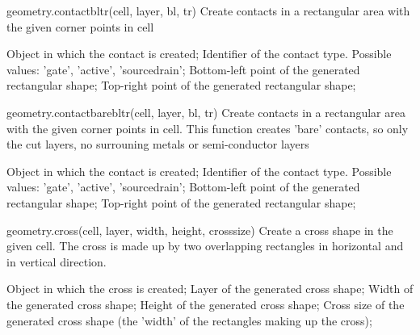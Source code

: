 \begin{APIfunc}{geometry.contactbltr(cell, layer, bl, tr)}
    Create contacts in a rectangular area with the given corner points in cell
    \begin{APIparameters}
            Object in which the contact is created;
            Identifier of the contact type. Possible values: 'gate', 'active', 'sourcedrain';
            Bottom-left point of the generated rectangular shape;
            Top-right point of the generated rectangular shape;
    \end{APIparameters}
\end{APIfunc}
\begin{APIfunc}{geometry.contactbarebltr(cell, layer, bl, tr)}
    Create contacts in a rectangular area with the given corner points in cell. This function creates 'bare' contacts, so only the cut layers, no surrouning metals or semi-conductor layers
    \begin{APIparameters}
            Object in which the contact is created;
            Identifier of the contact type. Possible values: 'gate', 'active', 'sourcedrain';
            Bottom-left point of the generated rectangular shape;
            Top-right point of the generated rectangular shape;
    \end{APIparameters}
\end{APIfunc}
\begin{APIfunc}{geometry.cross(cell, layer, width, height, crosssize)}
    Create a cross shape in the given cell. The cross is made up by two overlapping rectangles in horizontal and in vertical direction.
    \begin{APIparameters}
            Object in which the cross is created;
            Layer of the generated cross shape;
            Width of the generated cross shape;
            Height of the generated cross shape;
            Cross size of the generated cross shape (the 'width' of the rectangles making up the cross);
    \end{APIparameters}
\end{APIfunc}
